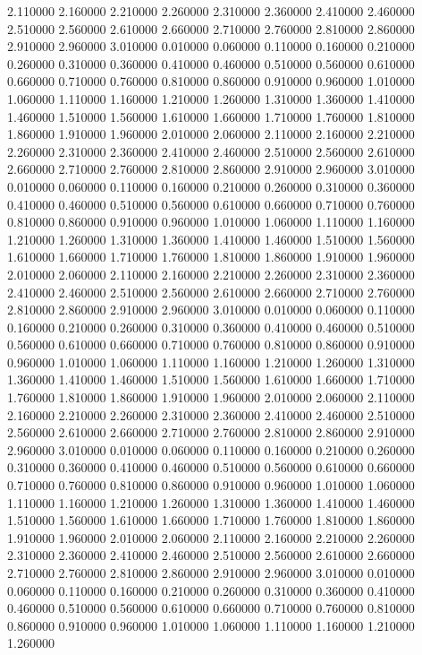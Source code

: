 2.110000
2.160000
2.210000
2.260000
2.310000
2.360000
2.410000
2.460000
2.510000
2.560000
2.610000
2.660000
2.710000
2.760000
2.810000
2.860000
2.910000
2.960000
3.010000
0.010000
0.060000
0.110000
0.160000
0.210000
0.260000
0.310000
0.360000
0.410000
0.460000
0.510000
0.560000
0.610000
0.660000
0.710000
0.760000
0.810000
0.860000
0.910000
0.960000
1.010000
1.060000
1.110000
1.160000
1.210000
1.260000
1.310000
1.360000
1.410000
1.460000
1.510000
1.560000
1.610000
1.660000
1.710000
1.760000
1.810000
1.860000
1.910000
1.960000
2.010000
2.060000
2.110000
2.160000
2.210000
2.260000
2.310000
2.360000
2.410000
2.460000
2.510000
2.560000
2.610000
2.660000
2.710000
2.760000
2.810000
2.860000
2.910000
2.960000
3.010000
0.010000
0.060000
0.110000
0.160000
0.210000
0.260000
0.310000
0.360000
0.410000
0.460000
0.510000
0.560000
0.610000
0.660000
0.710000
0.760000
0.810000
0.860000
0.910000
0.960000
1.010000
1.060000
1.110000
1.160000
1.210000
1.260000
1.310000
1.360000
1.410000
1.460000
1.510000
1.560000
1.610000
1.660000
1.710000
1.760000
1.810000
1.860000
1.910000
1.960000
2.010000
2.060000
2.110000
2.160000
2.210000
2.260000
2.310000
2.360000
2.410000
2.460000
2.510000
2.560000
2.610000
2.660000
2.710000
2.760000
2.810000
2.860000
2.910000
2.960000
3.010000
0.010000
0.060000
0.110000
0.160000
0.210000
0.260000
0.310000
0.360000
0.410000
0.460000
0.510000
0.560000
0.610000
0.660000
0.710000
0.760000
0.810000
0.860000
0.910000
0.960000
1.010000
1.060000
1.110000
1.160000
1.210000
1.260000
1.310000
1.360000
1.410000
1.460000
1.510000
1.560000
1.610000
1.660000
1.710000
1.760000
1.810000
1.860000
1.910000
1.960000
2.010000
2.060000
2.110000
2.160000
2.210000
2.260000
2.310000
2.360000
2.410000
2.460000
2.510000
2.560000
2.610000
2.660000
2.710000
2.760000
2.810000
2.860000
2.910000
2.960000
3.010000
0.010000
0.060000
0.110000
0.160000
0.210000
0.260000
0.310000
0.360000
0.410000
0.460000
0.510000
0.560000
0.610000
0.660000
0.710000
0.760000
0.810000
0.860000
0.910000
0.960000
1.010000
1.060000
1.110000
1.160000
1.210000
1.260000
1.310000
1.360000
1.410000
1.460000
1.510000
1.560000
1.610000
1.660000
1.710000
1.760000
1.810000
1.860000
1.910000
1.960000
2.010000
2.060000
2.110000
2.160000
2.210000
2.260000
2.310000
2.360000
2.410000
2.460000
2.510000
2.560000
2.610000
2.660000
2.710000
2.760000
2.810000
2.860000
2.910000
2.960000
3.010000
0.010000
0.060000
0.110000
0.160000
0.210000
0.260000
0.310000
0.360000
0.410000
0.460000
0.510000
0.560000
0.610000
0.660000
0.710000
0.760000
0.810000
0.860000
0.910000
0.960000
1.010000
1.060000
1.110000
1.160000
1.210000
1.260000
